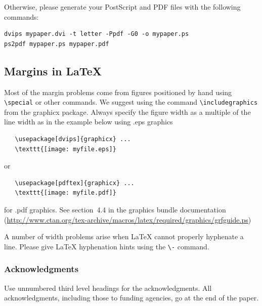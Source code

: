 \documentclass{article} %
\begin{document}
Otherwise, please generate your PostScript and PDF files with the following commands:
\begin{verbatim}
dvips mypaper.dvi -t letter -Ppdf -G0 -o mypaper.ps
ps2pdf mypaper.ps mypaper.pdf
\end{verbatim}

\subsection{Margins in LaTeX}

Most of the margin problems come from figures positioned by hand using
\verb+\special+ or other commands. We suggest using the command
\verb+\includegraphics+
from the graphicx package. Always specify the figure width as a multiple of
the line width as in the example below using .eps graphics
\begin{verbatim}
   \usepackage[dvips]{graphicx} ...
   \texttt{[image: myfile.eps]}
\end{verbatim}
or %
\begin{verbatim}
   \usepackage[pdftex]{graphicx} ...
   \texttt{[image: myfile.pdf]}
\end{verbatim}
for .pdf graphics.
See section~4.4 in the graphics bundle documentation (\url{http://www.ctan.org/tex-archive/macros/latex/required/graphics/grfguide.ps})

A number of width problems arise when LaTeX cannot properly hyphenate a
line. Please give LaTeX hyphenation hints using the \verb+\-+ command.


\subsubsection*{Acknowledgments}

Use unnumbered third level headings for the acknowledgments. All
acknowledgments, including those to funding agencies, go at the end of the paper.



\end{document}
